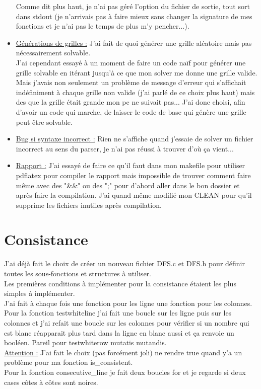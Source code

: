 \documentclass{article}
\begin{document}
\begin{itemize}
    Comme dit plus haut, je n'ai pas géré l'option du fichier de sortie, tout sort dans stdout (je n'arrivais pas à faire mieux sans changer la signature de mes fonctions et je n'ai pas le temps de plus m'y pencher...).\\
    \item\underline{Générations de grilles :} J'ai fait de quoi générer une grille aléatoire mais pas nécessairement solvable. \\
    J'ai cependant essayé à un moment de faire un code naïf pour générer une grille solvable en itérant jusqu'à ce que mon solver me donne une grille valide. Mais j'avais non seulement un problème de message d'erreur qui s'affichait indéfiniment à chaque grille non valide (j'ai parlé de ce choix plus haut) mais des que la grille était grande mon pc ne suivait pas... J'ai donc choisi, afin d'avoir un code qui marche, de laisser le code de base qui génère une grille peut être solvable.\\
    \item\underline{Bug si syntaxe incorrect :} Rien ne s'affiche quand j'essaie de solver un fichier incorrect au sens du parser, je n'ai pas réussi à trouver d'où ça vient...\\
    \item\underline{Rapport :} J'ai essayé de faire ce qu'il faut dans mon makefile pour utiliser pdflatex pour compiler le rapport mais impossible de trouver comment faire même avec des "\&\&" ou des ";" pour d'abord aller dans le bon dossier et après faire la compilation. J'ai quand même modifié mon CLEAN pour qu'il supprime les fichiers inutiles après compilation.\\
    
\end{itemize}

\newpage
\section{Consistance}

J'ai déjà fait le choix de créer un nouveau fichier DFS.c et DFS.h pour définir toutes les sous-fonctions et structures à utiliser.\\
Les premières conditions à implémenter pour la consistance étaient les plus simples à implémenter.\\
J'ai fait à chaque fois une fonction pour les ligne une fonction pour les colonnes.\\
Pour la fonction testwhiteline j'ai fait une boucle sur les ligne puis sur les colonnes et j'ai refait une boucle sur les colonnes pour vérifier si un nombre qui est blanc réapparait plus tard dans la ligne en blanc aussi et ça renvoie un booléen. Pareil pour testwhiterow mutatis mutandis.\\
\underline{Attention :} J'ai fait le choix (pas forcément joli) ne rendre true quand y'a un problème pour ma fonction is\_consistent.\\
Pour la fonction consecutive\_line je fait deux boucles for et je regarde si deux cases côtes à côtes sont noires.\\
\end{document}
